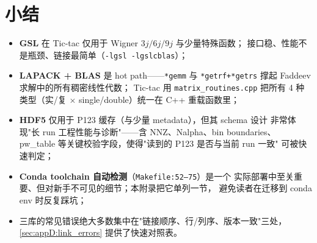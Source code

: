 \section{小结}

\begin{itemize}
\item \textbf{GSL} 在 Tic-tac 仅用于 Wigner $3j/6j/9j$ 与少量特殊函数；
      接口稳、性能不是瓶颈、链接最简单（\texttt{-lgsl -lgslcblas}）；
\item \textbf{LAPACK + BLAS} 是 hot path——\texttt{*gemm} 与 \texttt{*getrf+*getrs}
      撑起 Faddeev 求解中的所有稠密线性代数；
      Tic-tac 用 \texttt{matrix\_routines.cpp} 把所有 4 种类型（实/复 $\times$
      single/double）统一在 C++ 重载函数里；
\item \textbf{HDF5} 仅用于 P123 缓存（与少量 metadata），但其 schema 设计
      非常体现"长 run 工程性能与诊断"——含 NNZ、Nalpha、bin boundaries、
      pw\_table 等关键校验字段，使得"读到的 P123 是否与当前 run 一致"
      可被快速判定；
\item \textbf{Conda toolchain 自动检测}（\texttt{Makefile:52--75}）是一个
      实际部署中至关重要、但对新手不可见的细节；本附录把它单列一节，
      避免读者在迁移到 conda env 时反复踩坑；
\item 三库的常见错误绝大多数集中在"链接顺序、行/列序、版本一致"三处，
      \cref{sec:appD:link_errors} 提供了快速对照表。
\end{itemize}

